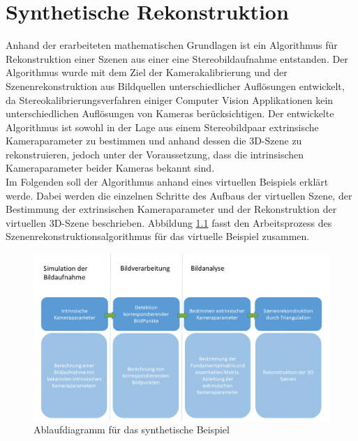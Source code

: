 \chapter{Synthetische Rekonstruktion}
\label{sec:minimal} 

Anhand der erarbeiteten mathematischen Grundlagen ist ein Algorithmus für Rekonstruktion einer Szenen aus einer eine Stereobildaufnahme entstanden. Der Algorithmus wurde mit dem Ziel der Kamerakalibrierung und der Szenenrekonstruktion aus Bildquellen unterschiedlicher Auflösungen entwickelt, da Stereokalibrierungsverfahren einiger Computer Vision Applikationen kein unterschiedlichen Auflösungen von Kameras berücksichtigen.
Der entwickelte Algorithmus ist sowohl in der Lage aus einem Stereobildpaar extrinsische Kameraparameter zu bestimmen und anhand dessen die 3D-Szene zu rekonstruieren, jedoch unter der Voraussetzung, dass die intrinsischen Kameraparameter beider Kameras bekannt sind.\\

Im Folgenden soll der Algorithmus anhand eines virtuellen Beispiels erklärt werde. Dabei werden die einzelnen Schritte des Aufbaus der virtuellen Szene, der Bestimmung der extrinsischen Kameraparameter und der Rekonstruktion der virtuellen 3D-Szene beschrieben. Abbildung \ref{fig:ArbeitsProzessVirtuell} fasst den Arbeitsprozess des Szenenrekonstruktionsalgorithmus für das virtuelle Beispiel zusammen. \\




\begin{figure}[!htb]%
	\centering
	\includegraphics[width=1.\linewidth]{images/NEU_Virtuel_Arbeitsprozess.png}
	\caption[Ablaufdiagram]{Ablaufdiagramm für das synthetische Beispiel}
	\label{fig:ArbeitsProzessVirtuell}
\end{figure}

